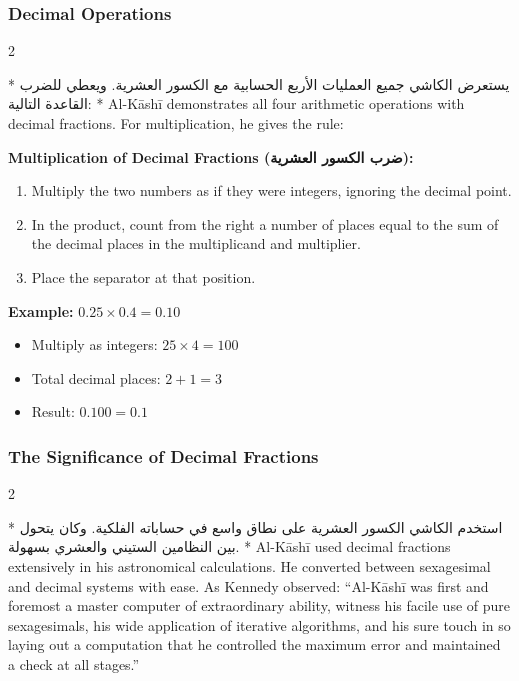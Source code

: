 \documentclass[11pt,a4paper]{article}
\newcommand{\ar}[1]{{\arabicfont\beginR #1\endR}}
\newenvironment{bilingual}{%
  \vspace{0.3em}%
  \begin{paracol}{2}%
}{%
  \end{paracol}%
  \vspace{0.3em}%
}
\newenvironment{mathalgo}{%
  \par\vspace{0.3cm}
  \begin{framed}
  \setlength{\parindent}{0pt}
}{%
  \end{framed}
  \par\vspace{0.3cm}
}
\begin{document}
\subsubsection{Decimal Operations}

\begin{bilingual}
\switchcolumn[0]*
\ar{يستعرض الكاشي جميع العمليات الأربع الحسابية مع الكسور العشرية. ويعطي للضرب القاعدة التالية:}
\switchcolumn[1]*
Al-K\=ash\=i demonstrates all four arithmetic operations with decimal
fractions. For multiplication, he gives the rule:
\end{bilingual}

\begin{mathalgo}
\textbf{Multiplication of Decimal Fractions (\ar{ضرب الكسور العشرية}):}
\begin{enumerate}[nosep]
  \item Multiply the two numbers as if they were integers, ignoring the
  decimal point.
  \item In the product, count from the right a number of places equal to
  the sum of the decimal places in the multiplicand and multiplier.
  \item Place the separator at that position.
\end{enumerate}

\textbf{Example:} $0.25 \times 0.4 = 0.10$
\begin{itemize}[nosep]
  \item Multiply as integers: $25 \times 4 = 100$
  \item Total decimal places: $2 + 1 = 3$
  \item Result: $0.100 = 0.1$
\end{itemize}
\end{mathalgo}

\subsubsection{The Significance of Decimal Fractions}

\begin{bilingual}
\switchcolumn[0]*
\ar{استخدم الكاشي الكسور العشرية على نطاق واسع في حساباته الفلكية. وكان يتحول بين النظامين الستيني والعشري بسهولة.}
\switchcolumn[1]*
Al-K\=ash\=i used decimal fractions extensively in his astronomical
calculations. He converted between sexagesimal and decimal systems with
ease. As Kennedy observed: ``Al-K\=ash\=i was first and foremost a master
computer of extraordinary ability, witness his facile use of pure
sexagesimals, his wide application of iterative algorithms, and his sure
touch in so laying out a computation that he controlled the maximum error
and maintained a check at all stages.''
\end{bilingual}
\end{document}
